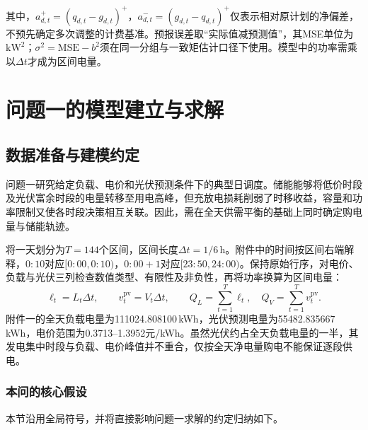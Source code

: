 \documentclass[withoutpreface,bwprint]{cumcmthesis}
\begin{document}
其中，$a^+_{d,t}=(q_{d,t}-g_{d,t})^+$，$a^-_{d,t}=(g_{d,t}-q_{d,t})^+$仅表示相对原计划的净偏差，不预先确定多次调整的计费基准。预报误差取“实际值减预测值”，其MSE单位为$\mathrm{kW}^2$；$\sigma^2=\mathrm{MSE}-b^2$须在同一分组与一致矩估计口径下使用。模型中的功率需乘以$\Delta t$才成为区间电量。
\clearpage
\endgroup

\section{问题一的模型建立与求解}
\label{sec:q1}
\subsection{数据准备与建模约定}
问题一研究给定负载、电价和光伏预测条件下的典型日调度。储能能够将低价时段及光伏富余时段的电量转移至用电高峰，但充放电损耗削弱了时移收益，容量和功率限制又使各时段决策相互关联。因此，需在全天供需平衡的基础上同时确定购电量与储能轨迹。

将一天划分为$T=144$个区间，区间长度$\Delta t=1/6$\,h。附件中的时间按区间右端解释，$0{:}10$对应$[0{:}00,0{:}10)$，$0{:}00+1$对应$[23{:}50,24{:}00)$。保持原始行序，对电价、负载与光伏三列检查数值类型、有限性及非负性，再将功率换算为区间电量：
\begin{equation}
 \ell_t=L_t\Delta t,\qquad v_t^{\mathrm{pv}}=V_t\Delta t,\qquad
 Q_L=\sum_{t=1}^{T}\ell_t,\quad Q_V=\sum_{t=1}^{T}v_t^{\mathrm{pv}}.
 \label{eq:q1-data}
\end{equation}
附件一的全天负载电量为111024.808100\,kWh，光伏预测电量为55482.835667\,kWh，电价范围为0.3713--1.3952元/kWh。虽然光伏约占全天负载电量的一半，其发电集中时段与负载、电价峰值并不重合，仅按全天净电量购电不能保证逐段供电。

\subsubsection{本问的核心假设}
本节沿用全局符号，并将直接影响问题一求解的约定归纳如下。
\end{document}
